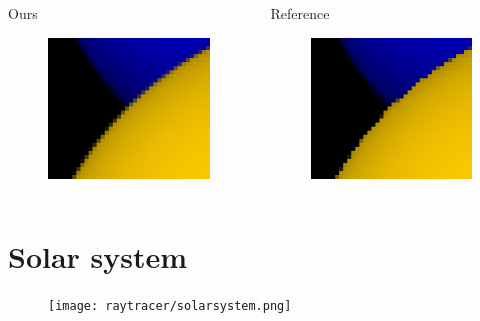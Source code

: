 \documentclass{beamer}
\begin{document}
\begin{frame}
	\begin{columns}[T]
		\begin{column}{.5\textwidth}
			Ours
			\begin{figure}
				\includegraphics[width=\textwidth]{raytracer/zoomed-scene01-ss.png}
			\end{figure}
		\end{column}
		\begin{column}{.5\textwidth}
			Reference
			\begin{figure}
				\includegraphics[width=\textwidth]{raytracer/zoomed-scene01-ss-ref.png}
			\end{figure}
		\end{column}
	\end{columns}
\end{frame}

\section{Solar system}
\begin{frame}
	\begin{figure}
		\texttt{[image: raytracer/solarsystem.png]}
	\end{figure}
\end{frame}
\end{document}
